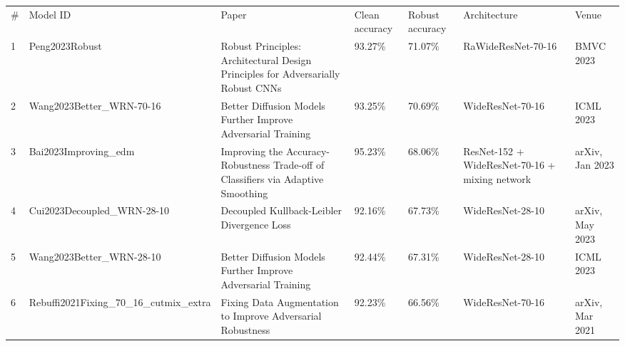 \begin{table}[]
    \begin{tabular}{lllllll}
    \# & Model ID                                 & Paper                                                                                                              & Clean accuracy & Robust accuracy & Architecture                                                      & Venue                                                      \\
    1  & Peng2023Robust                           & Robust Principles: Architectural Design Principles for Adversarially Robust CNNs                                   & 93.27\%        & 71.07\%         & RaWideResNet-70-16                                                & BMVC 2023                                                  \\
    2  & Wang2023Better\_WRN-70-16                & Better Diffusion Models Further Improve Adversarial Training                                                       & 93.25\%        & 70.69\%         & WideResNet-70-16                                                  & ICML 2023                                                  \\
    3  & Bai2023Improving\_edm                    & Improving the Accuracy-Robustness Trade-off of Classifiers via Adaptive Smoothing                                  & 95.23\%        & 68.06\%         & ResNet-152 + WideResNet-70-16 + mixing network                    & arXiv, Jan 2023                                            \\
    4  & Cui2023Decoupled\_WRN-28-10              & Decoupled Kullback-Leibler Divergence Loss                                                                         & 92.16\%        & 67.73\%         & WideResNet-28-10                                                  & arXiv, May 2023                                            \\
    5  & Wang2023Better\_WRN-28-10                & Better Diffusion Models Further Improve Adversarial Training                                                       & 92.44\%        & 67.31\%         & WideResNet-28-10                                                  & ICML 2023                                                  \\
    6  & Rebuffi2021Fixing\_70\_16\_cutmix\_extra & Fixing Data Augmentation to Improve Adversarial Robustness                                                         & 92.23\%        & 66.56\%         & WideResNet-70-16                                                  & arXiv, Mar 2021                                            \\

\end{tabular}
\end{table}
